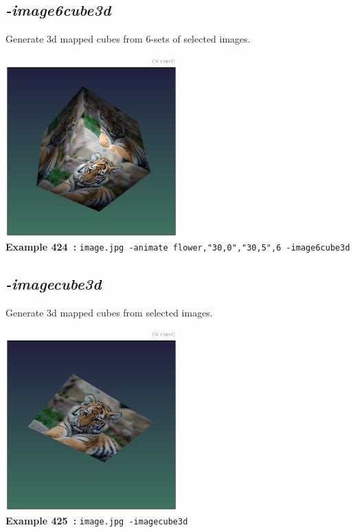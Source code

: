 \documentclass[a4paper,11pt,twoside]{book}
\begin{document}
\subsection{\emph{-image6cube3d} }\vspace*{-0.5em}
Generate 3d mapped cubes from 6-sets of selected images.
\begin{center}\includegraphics[keepaspectratio=true,height=7cm,width=\textwidth]{img/gmic_def424.jpg}\\
{\footnotesize \textbf{Example 424~:} \texttt{image.jpg -animate flower,"30,0","30,5",6 -image6cube3d}}
\end{center}

\subsection{\emph{-imagecube3d} }\vspace*{-0.5em}
Generate 3d mapped cubes from selected images.
\begin{center}\includegraphics[keepaspectratio=true,height=7cm,width=\textwidth]{img/gmic_def425.jpg}\\
{\footnotesize \textbf{Example 425~:} \texttt{image.jpg -imagecube3d}}
\end{center}
\end{document}
